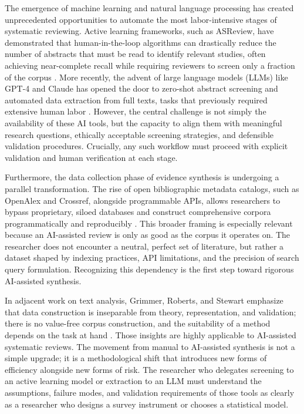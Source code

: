 \documentclass[12pt]{article}
\begin{document}
The emergence of machine learning and natural language processing has created unprecedented opportunities to automate the most labor-intensive stages of systematic reviewing. Active learning frameworks, such as ASReview, have demonstrated that human-in-the-loop algorithms can drastically reduce the number of abstracts that must be read to identify relevant studies, often achieving near-complete recall while requiring reviewers to screen only a fraction of the corpus \citep{vandeschoot2021asreview}. More recently, the advent of large language models (LLMs) like GPT-4 and Claude has opened the door to zero-shot abstract screening and automated data extraction from full texts, tasks that previously required extensive human labor \citep{mahmoudi2025,kim2025}. However, the central challenge is not simply the availability of these AI tools, but the capacity to align them with meaningful research questions, ethically acceptable screening strategies, and defensible validation procedures. Crucially, any such workflow must proceed with explicit validation and human verification at each stage.

Furthermore, the data collection phase of evidence synthesis is undergoing a parallel transformation. The rise of open bibliographic metadata catalogs, such as OpenAlex and Crossref, alongside programmable APIs, allows researchers to bypass proprietary, siloed databases and construct comprehensive corpora programmatically and reproducibly \citep{delgado2024,culbert2025}. This broader framing is especially relevant because an AI-assisted review is only as good as the corpus it operates on. The researcher does not encounter a neutral, perfect set of literature, but rather a dataset shaped by indexing practices, API limitations, and the precision of search query formulation. Recognizing this dependency is the first step toward rigorous AI-assisted synthesis.

In adjacent work on text analysis, Grimmer, Roberts, and Stewart emphasize that data construction is inseparable from theory, representation, and validation; there is no value-free corpus construction, and the suitability of a method depends on the task at hand \citep{grimmer2022text}. Those insights are highly applicable to AI-assisted systematic reviews. The movement from manual to AI-assisted synthesis is not a simple upgrade; it is a methodological shift that introduces new forms of efficiency alongside new forms of risk. The researcher who delegates screening to an active learning model or extraction to an LLM must understand the assumptions, failure modes, and validation requirements of those tools as clearly as a researcher who designs a survey instrument or chooses a statistical model.
\end{document}
